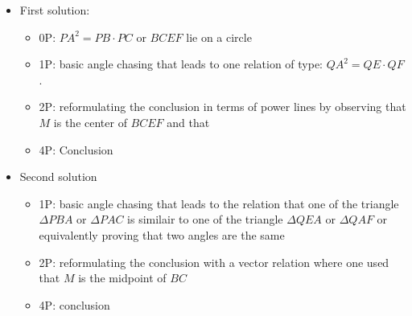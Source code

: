 \begin{itemize}
    \item First solution:

\begin{itemize}
    \item 0P: $PA^2=PB\cdot PC$ or $BCEF$ lie on a circle
    \item 1P: basic angle chasing that leads to one relation of type: $QA^2=QE\cdot QF$.
      \item 2P: reformulating the conclusion in terms of power lines by observing that $M$ is the center of $BCEF$ and that 
    \item 4P: Conclusion
\end{itemize}
  
    \item Second solution
    
    \begin{itemize}
    \item 1P: basic angle chasing that leads to the relation that one of the triangle $\Delta PBA$ or  $\Delta PAC$ is similair to one of the triangle $\Delta QEA$ or $\Delta QAF$ or equivalently proving that two angles are the same
    \item 2P: reformulating the conclusion with a vector relation where one used that $M$ is the midpoint of $BC$
    \item 4P: conclusion
\end{itemize}

\end{itemize}
